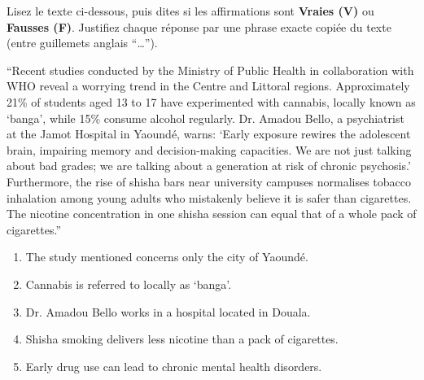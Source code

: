 \documentclass[11pt]{article}
\begin{document}
\begin{exercice}
Lisez le texte ci-dessous, puis dites si les affirmations sont \textbf{Vraies (V)} ou \textbf{Fausses (F)}. Justifiez chaque réponse par une phrase exacte copiée du texte (entre guillemets anglais “…”).
\begin{textebox}
“Recent studies conducted by the Ministry of Public Health in collaboration with WHO reveal a worrying trend in the Centre and Littoral regions. Approximately 21\% of students aged 13 to 17 have experimented with cannabis, locally known as ‘banga’, while 15\% consume alcohol regularly. Dr. Amadou Bello, a psychiatrist at the Jamot Hospital in Yaoundé, warns: ‘Early exposure rewires the adolescent brain, impairing memory and decision-making capacities. We are not just talking about bad grades; we are talking about a generation at risk of chronic psychosis.’ Furthermore, the rise of shisha bars near university campuses normalises tobacco inhalation among young adults who mistakenly believe it is safer than cigarettes. The nicotine concentration in one shisha session can equal that of a whole pack of cigarettes.”
\end{textebox}
\begin{enumerate}
    \item The study mentioned concerns only the city of Yaoundé.
    \item Cannabis is referred to locally as ‘banga’.
    \item Dr. Amadou Bello works in a hospital located in Douala.
    \item Shisha smoking delivers less nicotine than a pack of cigarettes.
    \item Early drug use can lead to chronic mental health disorders.
\end{enumerate}
\end{exercice}
\end{document}
